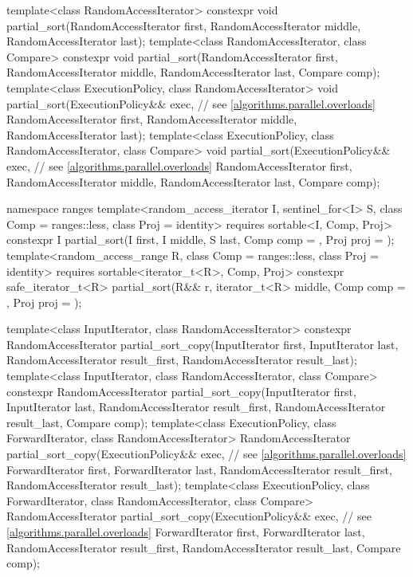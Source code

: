 \begin{codeblock}
{  template<class RandomAccessIterator>
    constexpr void partial_sort(RandomAccessIterator first,
                                RandomAccessIterator middle,
                                RandomAccessIterator last);
  template<class RandomAccessIterator, class Compare>
    constexpr void partial_sort(RandomAccessIterator first,
                                RandomAccessIterator middle,
                                RandomAccessIterator last, Compare comp);
  template<class ExecutionPolicy, class RandomAccessIterator>
    void partial_sort(ExecutionPolicy&& exec,                   // see \ref{algorithms.parallel.overloads}
                      RandomAccessIterator first,
                      RandomAccessIterator middle,
                      RandomAccessIterator last);
  template<class ExecutionPolicy, class RandomAccessIterator, class Compare>
    void partial_sort(ExecutionPolicy&& exec,                   // see \ref{algorithms.parallel.overloads}
                      RandomAccessIterator first,
                      RandomAccessIterator middle,
                      RandomAccessIterator last, Compare comp);

  namespace ranges {
    template<random_access_iterator I, sentinel_for<I> S, class Comp = ranges::less,
             class Proj = identity>
      requires sortable<I, Comp, Proj>
      constexpr I
        partial_sort(I first, I middle, S last, Comp comp = {}, Proj proj = {});
    template<random_access_range R, class Comp = ranges::less, class Proj = identity>
      requires sortable<iterator_t<R>, Comp, Proj>
      constexpr safe_iterator_t<R>
        partial_sort(R&& r, iterator_t<R> middle, Comp comp = {},
                     Proj proj = {});
  }

  template<class InputIterator, class RandomAccessIterator>
    constexpr RandomAccessIterator
      partial_sort_copy(InputIterator first, InputIterator last,
                        RandomAccessIterator result_first,
                        RandomAccessIterator result_last);
  template<class InputIterator, class RandomAccessIterator, class Compare>
    constexpr RandomAccessIterator
      partial_sort_copy(InputIterator first, InputIterator last,
                        RandomAccessIterator result_first,
                        RandomAccessIterator result_last,
                        Compare comp);
  template<class ExecutionPolicy, class ForwardIterator, class RandomAccessIterator>
    RandomAccessIterator
      partial_sort_copy(ExecutionPolicy&& exec,                 // see \ref{algorithms.parallel.overloads}
                        ForwardIterator first, ForwardIterator last,
                        RandomAccessIterator result_first,
                        RandomAccessIterator result_last);
  template<class ExecutionPolicy, class ForwardIterator, class RandomAccessIterator,
           class Compare>
    RandomAccessIterator
      partial_sort_copy(ExecutionPolicy&& exec,                 // see \ref{algorithms.parallel.overloads}
                        ForwardIterator first, ForwardIterator last,
                        RandomAccessIterator result_first,
                        RandomAccessIterator result_last,
                        Compare comp);

}
\end{codeblock}
